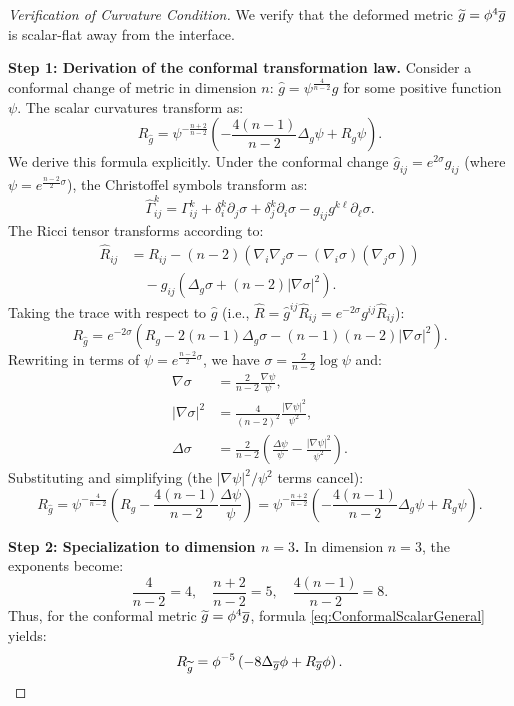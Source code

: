 \begin{proof}[Verification of Curvature Condition]
We verify that the deformed metric $\widetilde{g} = \phi^4 \overline{g}$ is scalar-flat away from the interface.

\textbf{Step 1: Derivation of the conformal transformation law.}
Consider a conformal change of metric in dimension $n$: $\hat{g} = \psi^{\frac{4}{n-2}} g$ for some positive function $\psi$. The scalar curvatures transform as:
\begin{equation}\label{eq:ConformalScalarGeneral}
    R_{\hat{g}} = \psi^{-\frac{n+2}{n-2}} \left( -\frac{4(n-1)}{n-2} \Delta_g \psi + R_g \psi \right).
\end{equation}
We derive this formula explicitly. Under the conformal change $\hat{g}_{ij} = e^{2\sigma} g_{ij}$ (where $\psi = e^{\frac{n-2}{2}\sigma}$), the Christoffel symbols transform as:
\[
    \hat{\Gamma}^k_{ij} = \Gamma^k_{ij} + \delta^k_i \partial_j \sigma + \delta^k_j \partial_i \sigma - g_{ij} g^{k\ell} \partial_\ell \sigma.
\]
The Ricci tensor transforms according to:
\begin{align*}
    \hat{R}_{ij} &= R_{ij} - (n-2)\left( \nabla_i \nabla_j \sigma - (\nabla_i \sigma)(\nabla_j \sigma) \right) \\
    &\quad - g_{ij}\left( \Delta_g \sigma + (n-2)|\nabla \sigma|^2 \right).
\end{align*}
Taking the trace with respect to $\hat{g}$ (i.e., $\hat{R} = \hat{g}^{ij}\hat{R}_{ij} = e^{-2\sigma}g^{ij}\hat{R}_{ij}$):
\[
    R_{\hat{g}} = e^{-2\sigma}\left( R_g - 2(n-1)\Delta_g \sigma - (n-1)(n-2)|\nabla\sigma|^2 \right).
\]
Rewriting in terms of $\psi = e^{\frac{n-2}{2}\sigma}$, we have $\sigma = \frac{2}{n-2}\log\psi$ and:
\begin{align*}
    \nabla \sigma &= \frac{2}{n-2} \frac{\nabla \psi}{\psi}, \\
    |\nabla \sigma|^2 &= \frac{4}{(n-2)^2} \frac{|\nabla \psi|^2}{\psi^2}, \\
    \Delta \sigma &= \frac{2}{n-2}\left( \frac{\Delta \psi}{\psi} - \frac{|\nabla \psi|^2}{\psi^2} \right).
\end{align*}
Substituting and simplifying (the $|\nabla\psi|^2/\psi^2$ terms cancel):
\[
    R_{\hat{g}} = \psi^{-\frac{4}{n-2}} \left( R_g - \frac{4(n-1)}{n-2} \frac{\Delta \psi}{\psi} \right) = \psi^{-\frac{n+2}{n-2}} \left( -\frac{4(n-1)}{n-2} \Delta_g \psi + R_g \psi \right).
\]

\textbf{Step 2: Specialization to dimension $n=3$.}
In dimension $n=3$, the exponents become:
\[
    \frac{4}{n-2} = 4, \quad \frac{n+2}{n-2} = 5, \quad \frac{4(n-1)}{n-2} = 8.
\]
Thus, for the conformal metric $\widetilde{g} = \phi^4 \overline{g}$, formula \eqref{eq:ConformalScalarGeneral} yields:
\begin{equation}\label{eq:ConformalScalar3D}
    R_{\widetilde{g}} = \phi^{-5} \left( -8\Delta_{\overline{g}}\phi + R_{\overline{g}} \phi \right).
\end{equation}


\end{proof}
